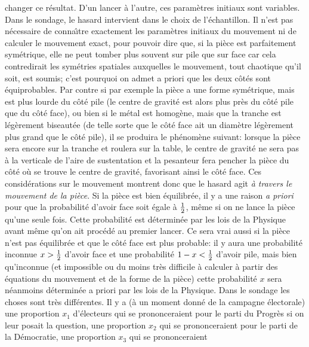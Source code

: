 changer ce r\'esultat. D'un lancer \`a l'autre, ces param\`etres initiaux 
sont variables.  Dans le sondage, le hasard intervient dans le choix de
l'\'echantillon. 
\medskip 
Il n'est pas n\'ecessaire de conna{\^\i}tre exactement les param\`etres
initiaux du mouvement ni de calculer le mouvement exact, pour 
pouvoir dire que, si la pi\`ece est parfaitement sym\'etrique, elle ne 
peut tomber plus souvent sur pile que sur face car cela contredirait les 
sym\'etries spatiales auxquelles le mouvement, tout chaotique qu'il 
soit, est soumis; c'est pourquoi on admet a priori que les deux c\^ot\'es 
sont \'equiprobables. 
\medskip 
Par contre si par exemple la pi\`ece a une forme sym\'etrique, 
mais est plus lourde du c\^ot\'e pile (le centre de gravit\'e 
est alors plus pr\`es du c\^ot\'e pile que du c\^ot\'e face), ou bien si le 
m\'etal est homog\`ene, mais que la tranche est l\'eg\`erement 
biseaut\'ee (de telle sorte que le c\^ot\'e face ait un diam\`etre 
l\'eg\`erement plus grand que le c\^ot\'e pile), il se produira le 
ph\'enom\`ene suivant: lorsque la pi\`ece sera encore sur la tranche et 
roulera sur la table, le centre de gravit\'e ne sera pas \`a la verticale de 
l'aire de sustentation et la pesanteur fera pencher la pi\`ece du c\^ot\'e 
o\`u se trouve le centre de gravit\'e, favorisant ainsi le c\^ot\'e face. 
Ces consid\'erations sur le mouvement montrent donc que le hasard agit 
{\it \`a travers le mouvement de la pi\`ece}. Si la pi\`ece est bien 
\'equilibr\'ee, il y a une raison {\it a priori} pour que la probabilit\'e 
d'avoir face soit \'egale \`a ${1 \over 2}$, m\^eme si on ne lance la 
pi\`ece qu'une seule fois. Cette probabilit\'e est d\'etermin\'ee par les 
lois de la Physique avant m\^eme qu'on ait proc\'ed\'e au premier lancer. 
Ce sera vrai aussi si la pi\`ece n'est pas \'equilibr\'ee et que le c\^ot\'e 
face est plus probable: il y aura une probabilit\'e inconnue $x > {1 \over 
2}$ d'avoir face et une probabilit\'e $1- x < {1 \over 2}$ d'avoir pile, 
mais bien qu'inconnue (et impossible ou du moins tr\`es difficile \`a 
calculer \`a partir des \'equations du mouvement et de la forme de la 
pi\`ece) cette probabilit\'e $x$ sera n\'eanmoins d\'etermin\'ee a 
priori par les lois de la Physique. 
\medskip
Dans le sondage les choses sont tr\`es diff\'erentes. Il y a (\`a un 
moment donn\'e de la campagne \'electorale) une proportion $x_1$ 
d'\'electeurs qui se prononceraient pour le parti du Progr\`es si on leur 
posait la question, une proportion $x_2$ qui se prononceraient pour le 
parti de la D\'emocratie, une proportion $x_3$ qui se prononceraient 
